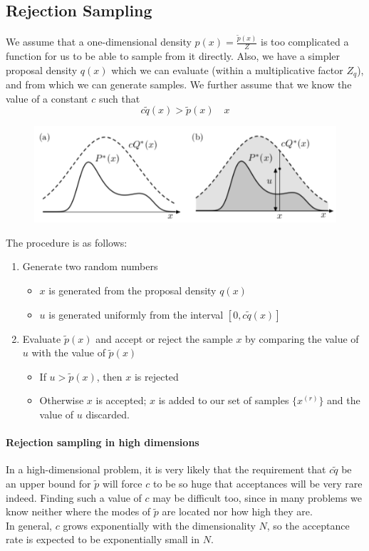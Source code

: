 \documentclass[11pt]{article}
\begin{document}
\subsection{Rejection Sampling}
We assume that a one-dimensional density $p(x) = \frac{\tilde{p}(x)}{Z}$ is too complicated a function for us to be able to sample from it directly. Also, we have a simpler proposal density $q(x)$ which we can evaluate (within a multiplicative factor $Z_q$), and from which we can generate samples. We further assume that we know the value of a constant $c$ such that
$$c\tilde{q}(x) > \tilde{p}(x) \quad x$$
\begin{figure}[H]
	\centering
	\includegraphics[scale=0.6]{p10.png}
\end{figure}
\noindent The procedure is as follows:
\begin{enumerate}
	\item Generate two random numbers
	\begin{itemize}
		\item $x$ is generated from the proposal density $q(x)$
		\item $u$ is generated uniformly from the interval $[0, c\tilde{q}(x)]$
	\end{itemize}
	\item Evaluate $\tilde{p}(x)$ and accept or reject the sample $x$ by comparing the value of $u$ with the value of $\tilde{p}(x)$
	\begin{itemize}
		\item If $u > \tilde{p}(x)$, then $x$ is rejected
		\item Otherwise $x$ is accepted; $x$ is added to our set of samples $\{x^{(r)}\}$ and the value of $u$ discarded.
	\end{itemize}
\end{enumerate}
\paragraph{Rejection sampling in high dimensions}
In a high-dimensional problem, it is very likely that the requirement that $c\tilde{q}$ be an upper bound for $\tilde{p}$ will force $c$ to be so huge that acceptances will be very rare indeed. Finding such a value of $c$ may be difficult too, since in many problems we know neither where the modes of $\tilde{p}$ are located nor how high they are.\\
In general, $c$ grows exponentially with the dimensionality $N$, so the acceptance rate is expected to be exponentially small in $N$.
\end{document}
